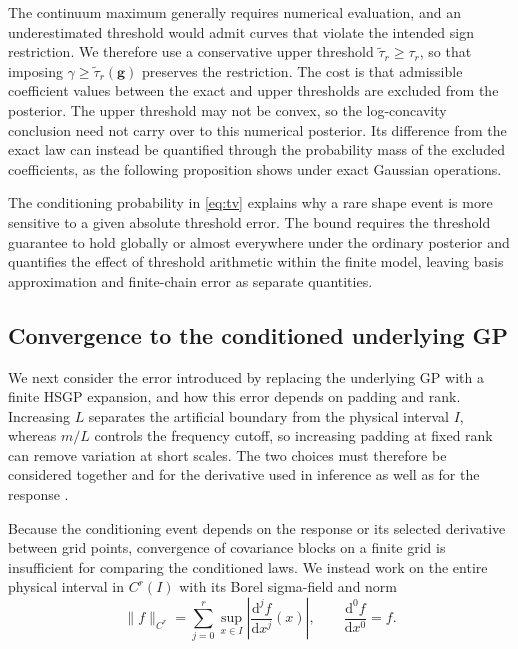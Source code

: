 The continuum maximum generally requires numerical evaluation, and
an underestimated threshold would admit curves that violate the
intended sign restriction. We therefore use a conservative upper
threshold $\widetilde\tau_r\geq\tau_r$, so that imposing
$\gamma\geq\widetilde\tau_r(\boldsymbol g)$ preserves the restriction.
The cost is that admissible coefficient values between the exact and
upper thresholds are excluded from the posterior.
The upper threshold may not be
convex, so the log-concavity conclusion need not carry over to this
numerical posterior. Its difference from the exact law can instead
be quantified through the probability mass of the excluded
coefficients, as the following proposition shows under exact Gaussian
operations.



The conditioning probability in \cref{eq:tv} explains why a rare
shape event is more sensitive to a given absolute threshold error.
The bound requires the threshold
guarantee to hold globally or almost everywhere under the ordinary
posterior and quantifies the effect of threshold arithmetic within
the finite model, leaving basis approximation and finite-chain error
as separate quantities.

\subsection{Convergence to the conditioned underlying GP}

We next consider the error introduced by replacing the underlying GP
with a finite HSGP expansion, and how this error depends on padding
and rank.
Increasing $L$ separates the artificial boundary from the physical
interval $I$, whereas $m/L$ controls the frequency cutoff, so increasing
padding at fixed rank can remove variation at short scales. The two
choices must therefore be considered together and for the derivative
used in inference as well as for the response
\citep{riutort2023practicalhsgp}.

Because the conditioning event depends on the response or its selected
derivative between grid points, convergence of covariance blocks on
a finite grid is insufficient for comparing the conditioned laws.
We instead work on the entire physical interval in
$C^r(I)$ with its Borel sigma-field and norm
\[
 \|f\|_{C^r}=\sum_{j=0}^r\sup_{x\in I}
             \left|\frac{\mathrm{d}^jf}{\mathrm{d}x^j}(x)\right|,
 \qquad \frac{\mathrm{d}^0f}{\mathrm{d}x^0}=f.
\]



